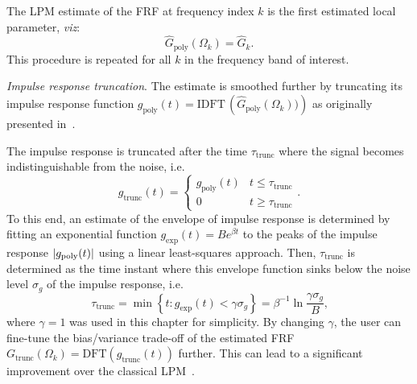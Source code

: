 \begin{enumerate}
  The \gls{LPM} estimate of the \gls{FRF} at frequency index $k$ is the first estimated local parameter, \emph{viz}:
\begin{equation}
\hat{G}_\text{poly}(\Omega_k) = \hat{G}_k
\text{.}
\end{equation}
This procedure is repeated for all $k$ in the frequency band of interest.


\emph{Impulse response truncation}. 
The estimate is smoothed further by truncating its impulse response function $g_{\text{poly}}(t) = \mathrm{IDFT}\, \left( \hat{G}_\text{poly}(\Omega_k)) \right)$ as originally presented in~\citep{Lumori2014TIM}.

The impulse response is truncated after the time $\tau_{\mathrm{trunc}}$ where the signal becomes indistinguishable from the noise, i.e.
\begin{equation}
  g_{\mathrm{trunc}}(t) = 
  \begin{cases}
    g_{\text{poly}}(t) & t \leq \tau_{\mathrm{trunc}} \\
    0                    & t \geq \tau_{\mathrm{trunc}}
  \end{cases}
  \text{.}
\end{equation}
To this end, an estimate of the envelope of impulse response is determined by fitting an exponential function $g_{\mathrm{exp}}(t) = B e^{\beta t}$ to the peaks of the impulse response $\left| g_{\mathrm{poly}}(t) \right|$ using a linear least-squares approach.
Then, $\tau_{\mathrm{trunc}}$ is determined as the time instant where this envelope function sinks below the noise level $\sigma_g$ of the impulse response, i.e. 
\begin{equation}
  \tau_{\mathrm{trunc}} = \min \left\{  t :  g_{\mathrm{exp}}(t) < \gamma \sigma_g \right\}
  = \beta^{-1} \ln \frac{\gamma \sigma_g}{B}
  \text{,}
\end{equation}
where $\gamma=1$ was used in this chapter for simplicity.
By changing $\gamma$, the user can fine-tune the bias/variance trade-off of the estimated FRF $G_{\mathrm{trunc}}(\Omega_k) = \mathrm{DFT} \left( g_{\mathrm{trunc}}(t)\right)$ further.
This can lead to a significant improvement over the classical LPM~\citep{Lumori2014TIM}.
 

\end{enumerate}
